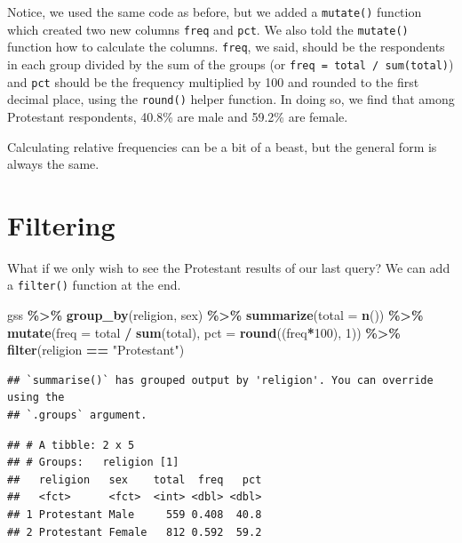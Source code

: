 \documentclass[
]{book}
\newenvironment{Shaded}{\begin{snugshade}}{\end{snugshade}}
\newcommand{\AttributeTok}[1]{\textcolor[rgb]{0.13,0.29,0.53}{#1}}
\newcommand{\DecValTok}[1]{\textcolor[rgb]{0.00,0.00,0.81}{#1}}
\newcommand{\FunctionTok}[1]{\textcolor[rgb]{0.13,0.29,0.53}{\textbf{#1}}}
\newcommand{\NormalTok}[1]{#1}
\newcommand{\SpecialCharTok}[1]{\textcolor[rgb]{0.81,0.36,0.00}{\textbf{#1}}}
\newcommand{\StringTok}[1]{\textcolor[rgb]{0.31,0.60,0.02}{#1}}
\begin{document}
Notice, we used the same code as before, but we added a \texttt{mutate()} function which created two new columns \texttt{freq} and \texttt{pct}.
We also told the \texttt{mutate()} function how to calculate the columns. \texttt{freq}, we said, should be the respondents in each group divided by the sum of the groups (or \texttt{freq\ =\ total\ /\ sum(total)}) and \texttt{pct} should be the frequency multiplied by 100 and rounded to the first decimal place, using the \texttt{round()} helper function. In doing so, we find that among Protestant respondents, 40.8\% are male and 59.2\% are female.

Calculating relative frequencies can be a bit of a beast, but the general form is always the same.

\hypertarget{filtering}{%
\section{Filtering}\label{filtering}}

What if we only wish to see the Protestant results of our last query? We can add a \texttt{filter()} function at the end.

\begin{Shaded}
\begin{Highlighting}[]
\NormalTok{gss }\SpecialCharTok{\%\textgreater{}\%}
  \FunctionTok{group\_by}\NormalTok{(religion, sex) }\SpecialCharTok{\%\textgreater{}\%}
  \FunctionTok{summarize}\NormalTok{(}\AttributeTok{total =} \FunctionTok{n}\NormalTok{()) }\SpecialCharTok{\%\textgreater{}\%}
  \FunctionTok{mutate}\NormalTok{(}\AttributeTok{freq =}\NormalTok{ total }\SpecialCharTok{/} \FunctionTok{sum}\NormalTok{(total),}
         \AttributeTok{pct =} \FunctionTok{round}\NormalTok{((freq}\SpecialCharTok{*}\DecValTok{100}\NormalTok{), }\DecValTok{1}\NormalTok{)) }\SpecialCharTok{\%\textgreater{}\%}
  \FunctionTok{filter}\NormalTok{(religion }\SpecialCharTok{==} \StringTok{"Protestant"}\NormalTok{)}
\end{Highlighting}
\end{Shaded}

\begin{verbatim}
## `summarise()` has grouped output by 'religion'. You can override using the
## `.groups` argument.
\end{verbatim}

\begin{verbatim}
## # A tibble: 2 x 5
## # Groups:   religion [1]
##   religion   sex    total  freq   pct
##   <fct>      <fct>  <int> <dbl> <dbl>
## 1 Protestant Male     559 0.408  40.8
## 2 Protestant Female   812 0.592  59.2
\end{verbatim}
\end{document}
